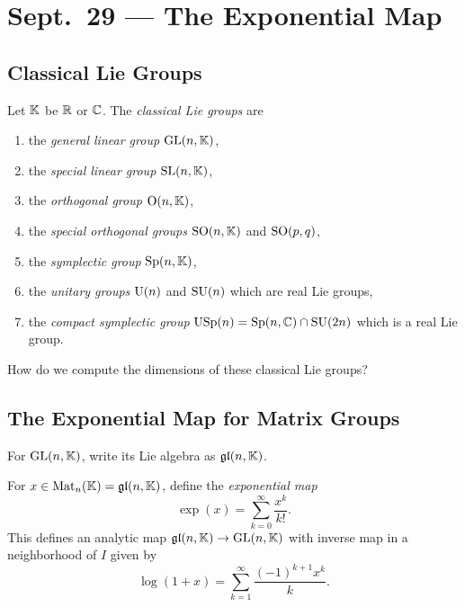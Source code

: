 \chapter{Sept.~29 --- The Exponential Map}

\section{Classical Lie Groups}

\begin{example}
  Let $\mathbb{K}$ be $\mathbb{R}$ or $\mathbb{C}$. The
  \emph{classical Lie groups} are
  \begin{enumerate}
    \item the \emph{general linear group} $\operatorname{GL}(n, \mathbb{K})$,
    \item the \emph{special linear group} $\operatorname{SL}(n, \mathbb{K})$,
    \item the \emph{orthogonal group} $\operatorname{O}(n, \mathbb{K})$,
    \item
      the \emph{special orthogonal groups}
      $\operatorname{SO}(n, \mathbb{K})$
      and $\operatorname{SO}(p, q)$,
    \item the \emph{symplectic group}
      $\operatorname{Sp}(n, \mathbb{K})$,
    \item the \emph{unitary groups} $\operatorname{U}(n)$ and $\operatorname{SU}(n)$
      which are real Lie groups,
    \item the \emph{compact symplectic group} $\mathrm{USp}(n) = \operatorname{Sp}(n, \mathbb{C}) \cap \operatorname{SU}(2n)$
      which is a real Lie group.
  \end{enumerate}
\end{example}

\begin{remark}
  How do we compute the dimensions
  of these classical Lie groups?
\end{remark}

\section{The Exponential Map for Matrix Groups}

\begin{remark}
  For $\operatorname{GL}(n, \mathbb{K})$, write its
  Lie algebra as $\mathfrak{gl}(n, \mathbb{K})$.
\end{remark}

\begin{definition}
  For $x \in \operatorname{Mat}_n(\mathbb{K}) = \mathfrak{gl}(n, \mathbb{K})$,
  define the \emph{exponential map}
  \[
    \exp(x) = \sum_{k = 0}^\infty \frac{x^k}{k!}.
  \]
  This defines an analytic
  map $\mathfrak{gl}(n, \mathbb{K}) \to \operatorname{GL}(n, \mathbb{K})$
  with inverse map in a neighborhood
  of $I$ given by
  \[
    \log(1 + x)
    = \sum_{k = 1}^\infty \frac{(-1)^{k + 1} x^k}{k}.
  \]
\end{definition}

